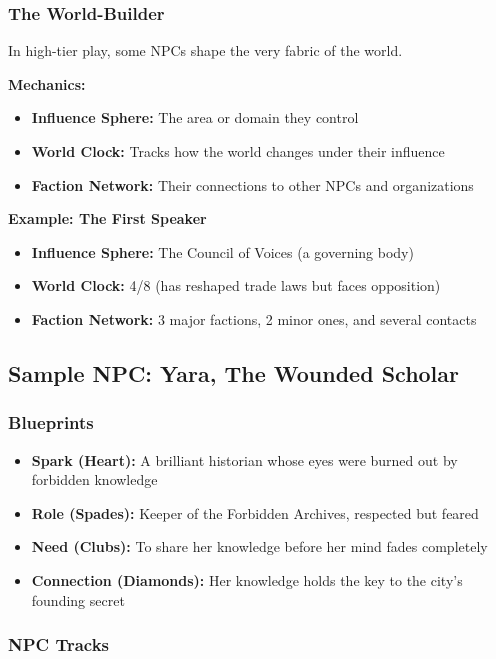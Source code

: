 \subsubsection{The World-Builder}

In high-tier play, some NPCs shape the very fabric of the world.

\textbf{Mechanics:}
\begin{itemize}
  \item \textbf{Influence Sphere:} The area or domain they control
  \item \textbf{World Clock:} Tracks how the world changes under their influence
  \item \textbf{Faction Network:} Their connections to other NPCs and organizations
\end{itemize}

\textbf{Example: The First Speaker}
\begin{itemize}
  \item \textbf{Influence Sphere:} The Council of Voices (a governing body)
  \item \textbf{World Clock:} 4/8 (has reshaped trade laws but faces opposition)
  \item \textbf{Faction Network:} 3 major factions, 2 minor ones, and several contacts
\end{itemize}

\subsection{Sample NPC: Yara, The Wounded Scholar}

\subsubsection{Blueprints}

\begin{itemize}
  \item \textbf{Spark (Heart):} A brilliant historian whose eyes were burned out by forbidden knowledge
  \item \textbf{Role (Spades):} Keeper of the Forbidden Archives, respected but feared
  \item \textbf{Need (Clubs):} To share her knowledge before her mind fades completely
  \item \textbf{Connection (Diamonds):} Her knowledge holds the key to the city's founding secret
\end{itemize}

\subsubsection{NPC Tracks}

